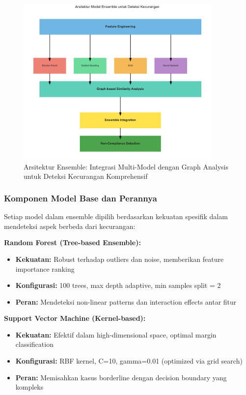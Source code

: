 \begin{figure}[htbp]
    \centering
    \includegraphics[width=0.9\textwidth]{figures/ensemble_architecture.pdf}
    \caption{Arsitektur Ensemble: Integrasi Multi-Model dengan Graph Analysis untuk Deteksi Kecurangan Komprehensif}
    \label{fig:ensemble_architecture_detail}
\end{figure}

\subsubsection{Komponen Model Base dan Perannya}
\label{sec:komponenModelBase}

Setiap model dalam ensemble dipilih berdasarkan kekuatan spesifik dalam mendeteksi aspek berbeda dari kecurangan:

\textbf{Random Forest (Tree-based Ensemble):}
\begin{itemize}
    \item \textbf{Kekuatan:} Robust terhadap outliers dan noise, memberikan feature importance ranking
    \item \textbf{Konfigurasi:} 100 trees, max depth adaptive, min samples split = 2
    \item \textbf{Peran:} Mendeteksi non-linear patterns dan interaction effects antar fitur
\end{itemize}

\textbf{Support Vector Machine (Kernel-based):}
\begin{itemize}
    \item \textbf{Kekuatan:} Efektif dalam high-dimensional space, optimal margin classification
    \item \textbf{Konfigurasi:} RBF kernel, C=10, gamma=0.01 (optimized via grid search)
    \item \textbf{Peran:} Memisahkan kasus borderline dengan decision boundary yang kompleks
\end{itemize}

